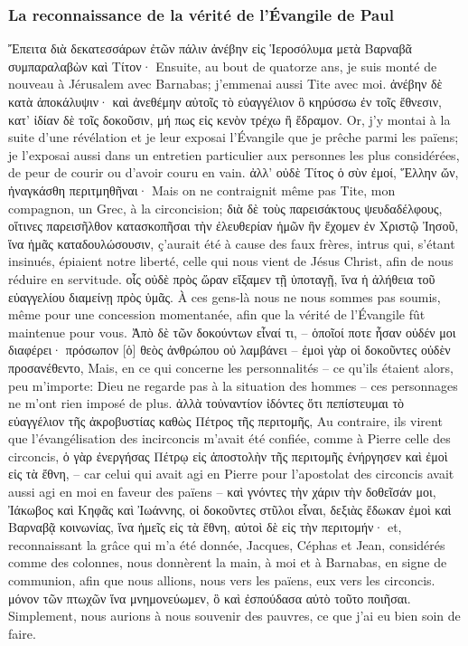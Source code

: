 \documentclass[14pt,a4paper,twoside]{extarticle}
\begin{document}
\begin{paracol}[1]
  \subsubsection*{La reconnaissance de la vérité de l'Évangile de Paul}
  \verset
  {Ἔπειτα διὰ δεκατεσσάρων ἐτῶν πάλιν ἀνέβην εἰς Ἱεροσόλυμα μετὰ Βαρναβᾶ συμπαραλαβὼν καὶ Τίτον·}
  {Ensuite, au bout de quatorze ans, je suis monté de nouveau à Jérusalem avec Barnabas; j’emmenai aussi Tite avec moi.}
  \verset
  {ἀνέβην δὲ κατὰ ἀποκάλυψιν· καὶ ἀνεθέμην αὐτοῖς τὸ εὐαγγέλιον ὃ κηρύσσω ἐν τοῖς ἔθνεσιν, κατ’ ἰδίαν δὲ τοῖς δοκοῦσιν, μή πως εἰς κενὸν τρέχω ἢ ἔδραμον.}
  {Or, j’y montai à la suite d’une révélation et je leur exposai l’Évangile que je prêche parmi les païens; je l’exposai aussi dans un entretien particulier aux personnes les plus considérées, de peur de courir ou d’avoir couru en vain.}
  \verset
  {ἀλλ’ οὐδὲ Τίτος ὁ σὺν ἐμοί, Ἕλλην ὤν, ἠναγκάσθη περιτμηθῆναι·}
  {Mais on ne contraignit même pas Tite, mon compagnon, un Grec, à la circoncision;}
  \verset
  {διὰ δὲ τοὺς παρεισάκτους ψευδαδέλφους, οἵτινες παρεισῆλθον κατασκοπῆσαι τὴν ἐλευθερίαν ἡμῶν ἣν ἔχομεν ἐν Χριστῷ Ἰησοῦ, ἵνα ἡμᾶς καταδουλώσουσιν,}
  {ç’aurait été à cause des faux frères, intrus qui, s’étant insinués, épiaient notre liberté, celle qui nous vient de Jésus Christ, afin de nous réduire en servitude.}
  \verset
  {οἷς οὐδὲ πρὸς ὥραν εἴξαμεν τῇ ὑποταγῇ, ἵνα ἡ ἀλήθεια τοῦ εὐαγγελίου διαμείνῃ πρὸς ὑμᾶς.}
  {À ces gens-là nous ne nous sommes pas soumis, même pour une concession momentanée, afin que la vérité de l’Évangile fût maintenue pour vous.}
  \verset
  {Ἀπὸ δὲ τῶν δοκούντων εἶναί τι, – ὁποῖοί ποτε ἦσαν οὐδέν μοι διαφέρει· πρόσωπον [ὁ] θεὸς ἀνθρώπου οὐ λαμβάνει – ἐμοὶ γὰρ οἱ δοκοῦντες οὐδὲν προσανέθεντο,}
  {Mais, en ce qui concerne les personnalités – ce qu’ils étaient alors, peu m’importe: Dieu ne regarde pas à la situation des hommes – ces personnages ne m’ont rien imposé de plus.}
  \verset
  {ἀλλὰ τοὐναντίον ἰδόντες ὅτι πεπίστευμαι τὸ εὐαγγέλιον τῆς ἀκροβυστίας καθὼς Πέτρος τῆς περιτομῆς,}
  {Au contraire, ils virent que l’évangélisation des incirconcis m’avait été confiée, comme à Pierre celle des circoncis,}
  \verset
  {ὁ γὰρ ἐνεργήσας Πέτρῳ εἰς ἀποστολὴν τῆς περιτομῆς ἐνήργησεν καὶ ἐμοὶ εἰς τὰ ἔθνη,}
  {– car celui qui avait agi en Pierre pour l’apostolat des circoncis avait aussi agi en moi en faveur des païens –}
  \verset
  {καὶ γνόντες τὴν χάριν τὴν δοθεῖσάν μοι, Ἰάκωβος καὶ Κηφᾶς καὶ Ἰωάννης, οἱ δοκοῦντες στῦλοι εἶναι, δεξιὰς ἔδωκαν ἐμοὶ καὶ Βαρναβᾷ κοινωνίας, ἵνα ἡμεῖς εἰς τὰ ἔθνη, αὐτοὶ δὲ εἰς τὴν περιτομήν·}
  {et, reconnaissant la grâce qui m’a été donnée, Jacques, Céphas et Jean, considérés comme des colonnes, nous donnèrent la main, à moi et à Barnabas, en signe de communion, afin que nous allions, nous vers les païens, eux vers les circoncis.}
  \verset
  {μόνον τῶν πτωχῶν ἵνα μνημονεύωμεν, ὃ καὶ ἐσπούδασα αὐτὸ τοῦτο ποιῆσαι.}
  {Simplement, nous aurions à nous souvenir des pauvres, ce que j’ai eu bien soin de faire.}



\end{paracol}
\end{document}
